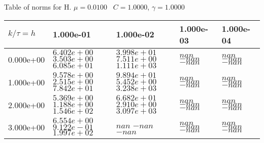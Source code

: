 \begin{center}
Table of norms for H. $\mu = 0.0100$ \, $C = 1.0000$, $\gamma = 1.0000$
  
\begin{tabular}{|p{1in}|p{1in}|p{1in}|p{1in}|p{1in}|} \hline
$k / \tau = h$ &1.000e-01 &1.000e-02 &1.000e-03 &1.000e-04 \\ \hline 
0.000e+00 & $6.402e+00$  $3.503e+00$  $6.085e+01$  & $3.998e+01$  $7.511e+00$  $1.111e+03$  & $nan$  $-nan$  $-nan$  & $nan$  $-nan$  $-nan$  \\ \hline 
1.000e+00 & $9.578e+00$  $2.515e+00$  $7.842e+01$  & $9.894e+01$  $5.452e+00$  $3.238e+03$  & $nan$  $-nan$  $-nan$  & $nan$  $-nan$  $-nan$  \\ \hline 
2.000e+00 & $5.369e+00$  $1.188e+00$  $1.546e+02$  & $6.682e+01$  $2.910e+00$  $3.097e+03$  & $nan$  $-nan$  $-nan$  & $nan$  $-nan$  $-nan$  \\ \hline 
3.000e+00 & $6.554e+00$  $9.122e-01$  $1.997e+02$  & $nan$  $-nan$  $-nan$  & $nan$  $-nan$  $-nan$  & $nan$  $-nan$  $-nan$  \\ \hline 

\end{tabular}\\[20pt]
\end{center}
